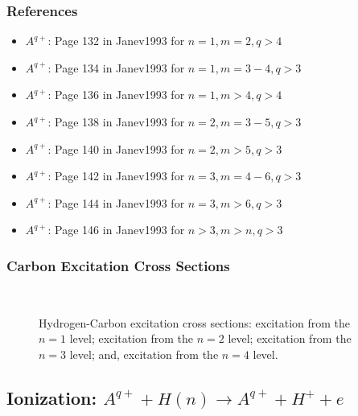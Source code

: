 \subsubsection{References}
\begin{itemize}
    \item $A^{q+}$: Page 132 in Janev1993\cite{janev1993cross} for $n=1,m=2,q>4$
    \item $A^{q+}$: Page 134 in Janev1993\cite{janev1993cross} for $n=1,m=3-4,q>3$
    \item $A^{q+}$: Page 136 in Janev1993\cite{janev1993cross} for $n=1,m>4,q>4$
    \item $A^{q+}$: Page 138 in Janev1993\cite{janev1993cross} for $n=2,m=3-5,q>3$
    \item $A^{q+}$: Page 140 in Janev1993\cite{janev1993cross} for $n=2,m>5,q>3$
    \item $A^{q+}$: Page 142 in Janev1993\cite{janev1993cross} for $n=3,m=4-6,q>3$
    \item $A^{q+}$: Page 144 in Janev1993\cite{janev1993cross} for $n=3,m>6,q>3$
    \item $A^{q+}$: Page 146 in Janev1993\cite{janev1993cross} for $n>3,m>n,q>3$
\end{itemize}
\newpage
\subsubsection{Carbon Excitation Cross Sections}
\begin{figure}[h!]%
    \centering
    \hspace{8pt}
     \\
    \hspace{8pt}
    \caption{Hydrogen-Carbon excitation cross sections:
         excitation from the $n=1$ level;
         excitation from the $n=2$ level;
         excitation from the $n=3$ level; and,
         excitation from the $n=4$ level.}
    \label{fig:H_C6_EX}
\end{figure}
\newpage

\subsection{Ionization: $A^{q+} + H(n) \rightarrow A^{q+} + H^+ + e$}
